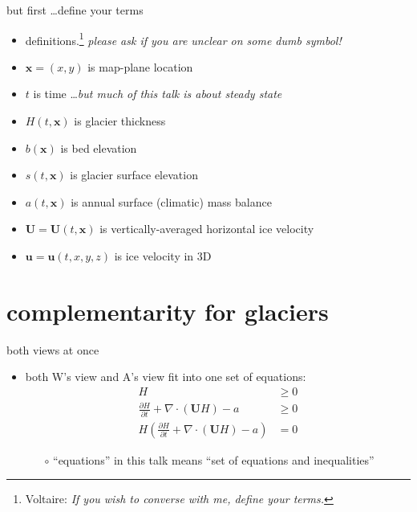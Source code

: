 \documentclass[10pt,hyperref,dvipsnames]{beamer}
\newcommand{\bx}{\mathbf{x}}
\newcommand{\bu}{\mathbf{u}}
\newcommand{\bU}{\mathbf{U}}
\newcommand{\Div}{\nabla\cdot}
\begin{document}
\begin{frame}{but first \dots define your terms}
\begin{itemize}
\item definitions.\footnote{Voltaire: \emph{If you wish to converse with me, define your terms.}}  \emph{please ask if you are unclear on some dumb symbol!}

\bigskip
\item $\bx = (x,y)$ is map-plane location
\item $t$ is time \dots \emph{but much of this talk is about steady state}

\medskip
\item $H(t,\bx)$ is glacier thickness
\item $b(\bx)$ is bed elevation
\item $s(t,\bx)$ is glacier surface elevation
\item $a(t,\bx)$ is annual surface (climatic) mass balance
\item $\bU = \bU(t,\bx)$ is vertically-averaged horizontal ice velocity
\item $\bu = \bu(t,x,y,z)$ is ice velocity in 3D
\end{itemize}
\end{frame}


\section{complementarity for glaciers}

\begin{frame}{both views at once}
\begin{itemize}
\item both W's view and A's view fit into one set of equations:
\begin{align*}
H &\ge 0 \\
\frac{\partial H}{\partial t} + \Div \left(\bU H\right) - a &\ge 0 \\
H \left(\frac{\partial H}{\partial t} + \Div \left(\bU H\right) - a\right) &= 0
\end{align*}
\begin{itemize}
\item[$\circ$] ``equations'' in this talk means ``set of equations and inequalities''
\end{itemize}
\end{itemize}
\end{frame}
\end{document}
